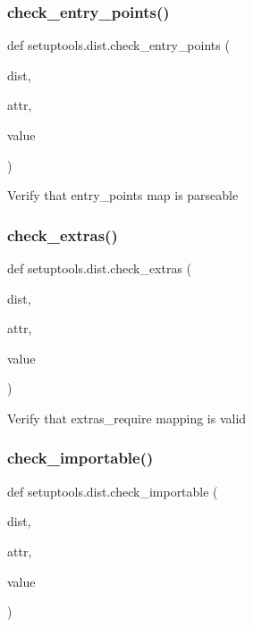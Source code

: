 \subsubsection{\texorpdfstring{check\+\_\+entry\+\_\+points()}{check\_entry\_points()}}
{\footnotesize\ttfamily def setuptools.\+dist.\+check\+\_\+entry\+\_\+points (\begin{DoxyParamCaption}\item[{}]{dist,  }\item[{}]{attr,  }\item[{}]{value }\end{DoxyParamCaption})}

\begin{DoxyVerb}Verify that entry_points map is parseable\end{DoxyVerb}
 \mbox{\label{namespacesetuptools_1_1dist_a67dcebb09dd6485db2f8850dfe3045f3}} 
\subsubsection{\texorpdfstring{check\+\_\+extras()}{check\_extras()}}
{\footnotesize\ttfamily def setuptools.\+dist.\+check\+\_\+extras (\begin{DoxyParamCaption}\item[{}]{dist,  }\item[{}]{attr,  }\item[{}]{value }\end{DoxyParamCaption})}

\begin{DoxyVerb}Verify that extras_require mapping is valid\end{DoxyVerb}
 \mbox{\label{namespacesetuptools_1_1dist_a34c7bc2fb87e3610638e5e71cbbebb9c}} 
\subsubsection{\texorpdfstring{check\+\_\+importable()}{check\_importable()}}
{\footnotesize\ttfamily def setuptools.\+dist.\+check\+\_\+importable (\begin{DoxyParamCaption}\item[{}]{dist,  }\item[{}]{attr,  }\item[{}]{value }\end{DoxyParamCaption})}

